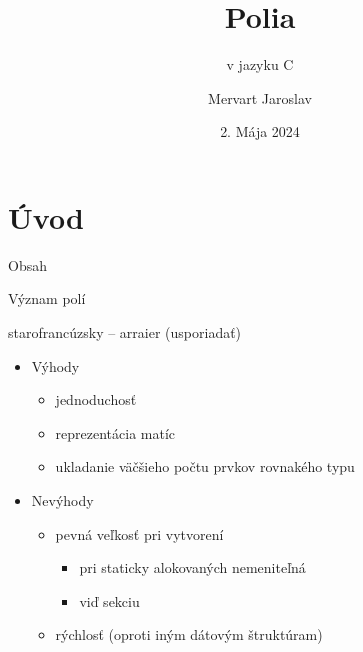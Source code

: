 \documentclass[xcolor=dvipsnames]{beamer}
\title[Polia]{{\Huge Polia}}
\subtitle{v jazyku C}
\institute[]{Vysoké učení technické v~Brně}
\author[Dátové štruktúry ]{Mervart Jaroslav }
\date{2. Mája 2024}
\begin{document}
{
\begin{frame}[noframenumbering]
    \maketitle
\end{frame}
}
\section{Úvod}
\begin{frame}{Obsah}
    \tableofcontents[sectionstyle=show]
\end{frame}
\begin{frame}{Význam polí }
    \begin{block}{\footnotesize{starofrancúzsky -- arraier (usporiadať)}}
\begin{quote}
     \footnotemark 
\end{quote}
\end{block}
    \begin{itemize}
        \item Výhody
        \begin{itemize}
            \item jednoduchosť
            \item reprezentácia matíc
            \item ukladanie väčšieho počtu prvkov rovnakého typu
        \end{itemize}
        \item Nevýhody
        \begin{itemize}
            \item pevná veľkosť pri vytvorení
            \begin{itemize}
                \item pri staticky alokovaných nemeniteľná
                \item viď sekciu 
            \end{itemize}
            \item rýchlosť (oproti iným dátovým štruktúram)
        \end{itemize}
    \end{itemize}
\end{frame}
\end{document}

